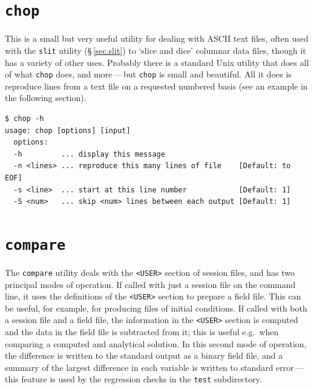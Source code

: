 \documentclass[11pt]{report}
\newcommand{\eg}{e.g.\ } \newcommand{\CC}{\mathrm{c.c.}}
\begin{document}
\section{\texttt{chop}}
\label{sec.chop}

This is a small but very useful utility for dealing with ASCII text
files, often used with the \verb|slit| utility (\S\,\ref{sec.slit}) to
`slice and dice' columnar data files, though it has a variety of other
uses.  Probably there is a standard Unix utility that does all of what
\verb|chop| does, and more\,---\,but \verb|chop| is small and
beautiful. All it does is reproduce lines from a text file on a
requested numbered basis (see an example in the following section).
{\small
\begin{verbatim}
$ chop -h
usage: chop [options] [input]
  options:
  -h         ... display this message
  -n <lines> ... reproduce this many lines of file    [Default: to EOF]
  -s <line>  ... start at this line number            [Default: 1]
  -S <num>   ... skip <num> lines between each output [Default: 1]
\end{verbatim}
}

\section{\texttt{compare}}
\label{sec.compare}

The \verb|compare| utility deals with the \verb|<USER>| section of
session files, and has two principal modes of operation.  If called
with just a session file on the command line, it uses the definitions
of the \verb|<USER>| section to prepare a field file.  This can be
useful, for example, for producing files of initial conditions.  If
called with both a session file and a field file, the information in
the \verb|<USER>| section is computed and the data in the field file
is subtracted from it; this is useful \eg when comparing a computed
and analytical solution.  In this second mode of operation, the
difference is written to the standard output as a binary field file,
and a summary of the largest difference in each variable is written to
standard error\,---\,this feature is used by the regression checks in
the \verb|test| subdirectory.
\end{document}
